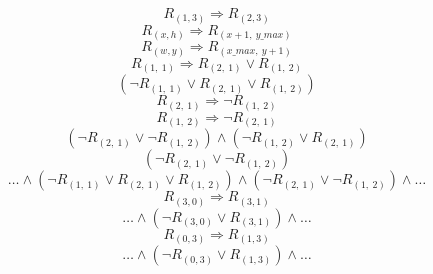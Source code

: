 \documentclass[24pt,a4paper]{article}
\begin{document}
\begin{equation}
	R_{(1, 3)} \Rightarrow R_{(2, 3)}
\end{equation}
\begin{equation}
	R_{(x, h)} \Rightarrow R_{(x + 1,\ y\_max)}
\end{equation}
\begin{equation}
	R_{(w, y)} \Rightarrow R_{(x\_max,\ y + 1)}
\end{equation}
\begin{equation}
R_{(1,\ 1)} \Rightarrow R_{(2,\ 1)} \lor R_{(1,\ 2)}
\end{equation}
\begin{equation}
(\lnot R_{(1,\ 1)} \lor R_{(2,\ 1)} \lor R_{(1,\ 2)})
\end{equation}
\begin{equation}
R_{(2,\ 1)} \Rightarrow \lnot R_{(1,\ 2)}
\end{equation}
\begin{equation}
R_{(1,\ 2)} \Rightarrow \lnot R_{(2,\ 1)}
\end{equation}
\begin{equation}
(\lnot R_{(2,\ 1)} \lor \lnot R_{(1,\ 2)}) \land (\lnot R_{(1,\ 2)} \lor R_{(2,\ 1)})
\end{equation}
\begin{equation}
(\lnot R_{(2,\ 1)} \lor \lnot R_{(1,\ 2)})
\end{equation}
\begin{equation}
\dots \land (\lnot R_{(1,\ 1)} \lor R_{(2,\ 1)} \lor R_{(1,\ 2)}) \land (\lnot R_{(2,\ 1)} \lor \lnot R_{(1,\ 2)}) \land \dots
\end{equation}
\begin{equation}
R_{(3, 0)} \Rightarrow R_{(3, 1)}
\end{equation}
\begin{equation}
\dots \land (\lnot R_{(3, 0)} \lor R_{(3, 1)}) \land \dots
\end{equation}
\begin{equation}
R_{(0, 3)} \Rightarrow R_{(1, 3)}
\end{equation}
\begin{equation}
\dots \land (\lnot R_{(0, 3)} \lor R_{(1, 3)}) \land \dots
\end{equation}
\end{document}
